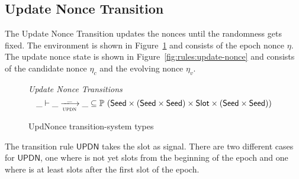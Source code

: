 \subsection{Update Nonce Transition}
\label{sec:update-nonces-trans}

The Update Nonce Transition updates the nonces until the randomness gets
fixed. The environment is shown in Figure~\ref{fig:ts-types:updnonce} and
consists of the epoch nonce $\eta$. The update nonce state is shown in
Figure~\ref{fig:rules:update-nonce} and consists of the candidate nonce
$\eta_c$ and the evolving nonce $\eta_v$.

\begin{figure}
  \emph{Update Nonce Transitions}
  \begin{equation*}
    \_ \vdash \var{\_} \trans{updn}{\_} \var{\_} \subseteq
    \powerset (\Seed \times (\Seed\times\Seed) \times \Slot \times (\Seed\times\Seed))
  \end{equation*}
  \caption{UpdNonce transition-system types}
  \label{fig:ts-types:updnonce}
\end{figure}

The transition rule $\mathsf{UPDN}$ takes the slot  as signal.
There are two different cases for $\mathsf{UPDN}$, one where  is not yet
\SlotsPrior{} slots from the beginning of the epoch and one where  is at least
\SlotsPrior{} slots after the first slot of the epoch.

